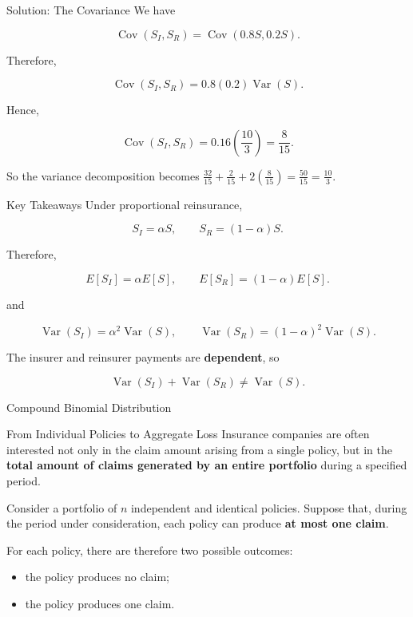 \documentclass[
  ignorenonframetext,
  aspectratio=169,
]{beamer}
\providecommand{\tightlist}{%
  \setlength{\itemsep}{0pt}\setlength{\parskip}{0pt}}
\begin{document}
\begin{frame}{Solution: The Covariance}
\protect{}\label{solution-the-covariance}
We have

\[
\operatorname{Cov}(S_I,S_R)
=
\operatorname{Cov}(0.8S,0.2S).
\]

Therefore,

\[
\operatorname{Cov}(S_I,S_R)
=
0.8(0.2)\operatorname{Var}(S).
\]

Hence,

\[
\operatorname{Cov}(S_I,S_R)
=
0.16\left(\frac{10}{3}\right)
=
\boxed{\frac{8}{15}}.
\]

So the variance decomposition becomes
\(\frac{32}{15}+\frac{2}{15}+2\left(\frac{8}{15}\right)=\frac{50}{15}=\frac{10}{3}.\)
\end{frame}

\begin{frame}{Key Takeaways}
\protect{}\label{key-takeaways}
Under proportional reinsurance,

\[
\boxed{S_I=\alpha S,\qquad S_R=(1-\alpha)S}.
\]

Therefore,

\[
E[S_I]=\alpha E[S],
\qquad
E[S_R]=(1-\alpha)E[S].
\]

and

\[
\operatorname{Var}(S_I)=\alpha^2\operatorname{Var}(S),
\qquad
\operatorname{Var}(S_R)=(1-\alpha)^2\operatorname{Var}(S).
\]

The insurer and reinsurer payments are \textbf{dependent}, so

\[
\operatorname{Var}(S_I)+\operatorname{Var}(S_R)
\neq
\operatorname{Var}(S).
\]

\begin{block}{Compound Binomial Distribution}
\protect{}\label{compound-binomial-distribution}
\begin{block}{From Individual Policies to Aggregate Loss}
\protect{}\label{from-individual-policies-to-aggregate-loss-1}
Insurance companies are often interested not only in the claim amount
arising from a single policy, but in the \textbf{total amount of claims
generated by an entire portfolio} during a specified period.

Consider a portfolio of \(n\) independent and identical policies.
Suppose that, during the period under consideration, each policy can
produce \textbf{at most one claim}.

For each policy, there are therefore two possible outcomes:

\begin{itemize}
\tightlist
\item
  the policy produces no claim;
\item
  the policy produces one claim.
\end{itemize}


\end{block}
\end{block}
\end{frame}
\end{document}
